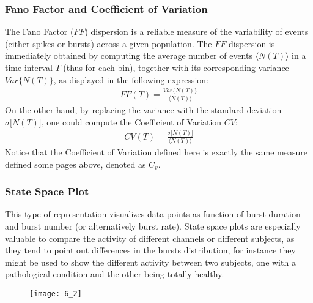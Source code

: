 \subsubsection{Fano Factor and Coefficient of Variation}
The Fano Factor (\(FF\)) dispersion is a reliable measure of the variability of events
(either spikes or bursts) across a given population. The \(FF\) dispersion is
immediately obtained by computing the average number of events \(\langle{N(T)}\rangle\)
in a time interval \(T\) (thus for each bin), together with its corresponding variance
\(Var\{N(T)\}\), as displayed in the following expression:
\begin{align*}
    FF(T)=\frac{Var\{N(T)\}}{\langle{N(T)}\rangle}
\end{align*}
On the other hand, by replacing the variance with the standard deviation
\(\sigma\bigl[N(T)\bigr]\), one could compute the Coefficient of Variation
\(CV\):
\begin{align*}
    CV(T)=\frac{\sigma\bigl[N(T)\bigr]}{\langle{N(T)}\rangle}
\end{align*}
Notice that the Coefficient of Variation defined here is exactly the same
measure defined some pages above, denoted as \(C_v\).

\subsubsection{State Space Plot}
This type of representation visualizes data points as function of burst duration
and burst number (or alternatively burst rate). State space plots are
especially valuable to compare the activity of different channels or different
subjects, as they tend to point out differences in the bursts distribution,
for instance they might be used to show the different activity between two
subjects, one with a pathological condition and the other being totally healthy.
\begin{figure}[H]
    \texttt{[image: 6\_2]}
    \centering
\end{figure}